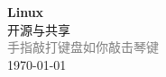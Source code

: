 \vspace*{\fill}
\begin{center}
    \textcolor{orange!50}{\Huge\textbf{Linux}} \\[1em]
    \textcolor{orange!60!pink}{\Large 开源与共享} \\[2em]
    \textcolor{gray}{\large 手指敲打键盘如你敲击琴键} \\[1em]
    \today
\end{center}
\vspace*{\fill}
\clearpage


\clearpage

\clearpage


